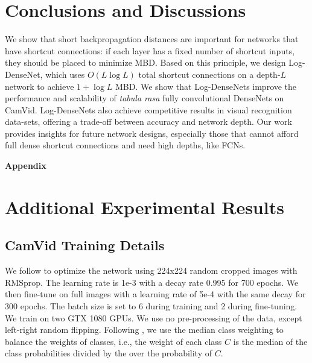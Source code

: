 \documentclass{article}
\newcommand{\logdense}{Log-DenseNet\xspace}
\newcommand{\logdenses}{Log-DenseNets\xspace}
\newcommand{\pbd}{MBD\xspace}
\begin{document}
\vspace{-5pt}
\section{Conclusions and Discussions}
\vspace{-5pt}
\label{sec:conclusion}
We show that short backpropagation distances are important for networks that have shortcut connections: if each layer has a fixed number of shortcut inputs, they should be placed to minimize \pbd. Based on this principle, we design \logdense, which uses $O(L \log L)$ total shortcut connections on a depth-$L$ network to achieve $1 + \log L$ \pbd. We show that \logdenses improve the performance and scalability of \textit{tabula rasa} fully convolutional DenseNets on CamVid. \logdenses also achieve competitive results in visual recognition data-sets, offering a trade-off between accuracy and network depth. Our work provides insights for future network designs, especially those that cannot afford full dense shortcut connections and need high depths, like FCNs.







\newpage
\appendix


\textbf{Appendix}





\section{Additional Experimental Results}

\subsection{CamVid Training Details}
We follow \cite{fcdense} to optimize the network using 224x224 random cropped images with RMSprop. The learning rate is 1e-3 with a decay rate 0.995 for 700 epochs. We then fine-tune on full images with a learning rate of 5e-4 with the same decay for 300 epochs.  The batch size is set to 6 during training and 2 during fine-tuning. We train on two GTX 1080 GPUs. 
We use no pre-processing of the data, except left-right random flipping. Following \cite{segnet}, we use the median class weighting to balance the weights of classes, i.e., the weight of each class $C$ is the median of the class probabilities divided by the over the probability of $C$. 
\end{document}
